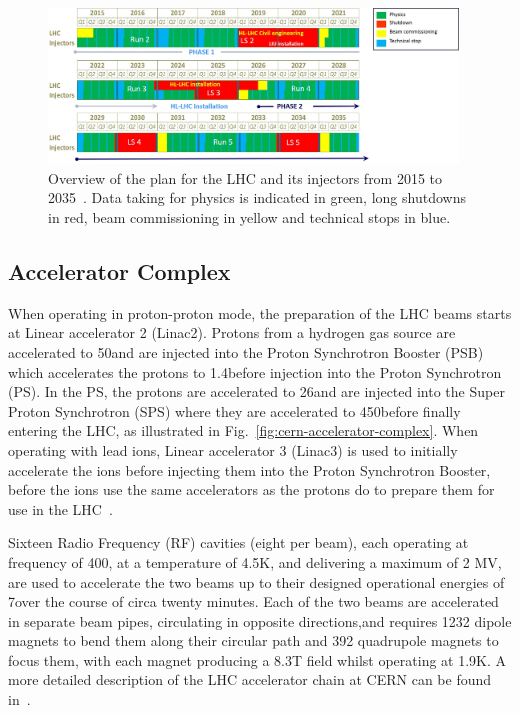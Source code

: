 \begin{figure}[htbp]
\begin{center}
\includegraphics[width=0.97\textwidth]{figs/lhc/LHC-Planning.jpg}
\caption{Overview of the plan for the LHC and its injectors from 2015 to 2035~\cite{P2TrackerTDR}. Data taking for physics is indicated in green, long shutdowns in red, beam commissioning in yellow and technical stops in blue.}
\label{fig:lhc-planning}
\end{center}
\end{figure}

\subsection{Accelerator Complex}
When operating in proton-proton mode, the preparation of the LHC beams starts at Linear accelerator 2 (Linac2). 
Protons from a hydrogen gas source are accelerated to 50\MeV and are injected into the Proton Synchrotron Booster (PSB) which accelerates the protons to 1.4\GeV before injection into the Proton Synchrotron (PS). 
In the PS, the protons are accelerated to 26\GeV and are injected into the Super Proton Synchrotron (SPS) where they are accelerated to 450\GeV before finally entering the LHC, as illustrated in Fig.~\ref{fig:cern-accelerator-complex}. 
When operating with lead ions, Linear accelerator 3 (Linac3) is used to initially accelerate the ions before injecting them into the Proton Synchrotron Booster, before the ions use the same accelerators as the protons do to prepare them for use in the LHC~\cite{Bruning:782076}. 

Sixteen Radio Frequency (RF) cavities (eight per beam), each operating at frequency of 400\MHz, at a temperature of 4.5K, and delivering a maximum of 2 MV, are used to accelerate the two beams up to their designed operational energies of 7\TeV over the course of circa twenty minutes.
Each of the two beams are accelerated in separate beam pipes, circulating in opposite directions,and requires 1232 dipole magnets to bend them along their circular path and 392 quadrupole magnets to focus them, with each magnet producing a 8.3T field whilst operating at 1.9K.
A more detailed description of the LHC accelerator chain at CERN can be found in~\cite{Schindl:397574}. 

